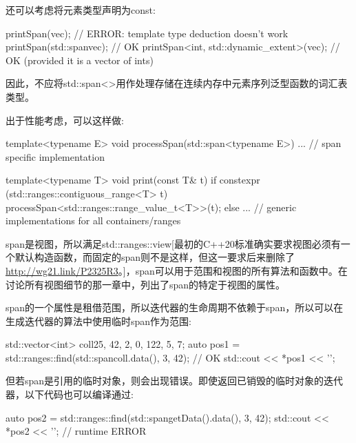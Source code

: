 还可以考虑将元素类型声明为const:

\begin{cpp}
printSpan(vec); // ERROR: template type deduction doesn’t work
printSpan(std::span{vec}); // OK
printSpan<int, std::dynamic_extent>(vec); // OK (provided it is a vector of ints)
\end{cpp}

因此，不应将std::span<>用作处理存储在连续内存中元素序列泛型函数的词汇表类型。

出于性能考虑，可以这样做:

\begin{cpp}
template<typename E>
void processSpan(std::span<typename E>) {
	... // span specific implementation
}

template<typename T>
void print(const T& t) {
	if constexpr (std::ranges::contiguous_range<T> t) {
		processSpan<std::ranges::range_value_t<T>>(t);
	}
	else {
		... // generic implementations for all containers/ranges
	}
}
\end{cpp}


span是视图，所以满足std::ranges::view[最初的C++20标准确实要求视图必须有一个默认构造函数，而固定的span则不是这样，但这一要求后来删除了\url{http://wg21.link/P2325R3}。]，span可以用于范围和视图的所有算法和函数中。在讨论所有视图细节的那一章中，列出了span的特定于视图的属性。

span的一个属性是租借范围，所以迭代器的生命周期不依赖于span，所以可以在生成迭代器的算法中使用临时span作为范围:

\begin{cpp}
std::vector<int> coll{25, 42, 2, 0, 122, 5, 7};
auto pos1 = std::ranges::find(std::span{coll.data(), 3}, 42); // OK
std::cout << *pos1 << '\n';
\end{cpp}

但若span是引用的临时对象，则会出现错误。即使返回已销毁的临时对象的迭代器，以下代码也可以编译通过:

\begin{cpp}
auto pos2 = std::ranges::find(std::span{getData().data(), 3}, 42);
std::cout << *pos2 << '\n'; // runtime ERROR
\end{cpp}











